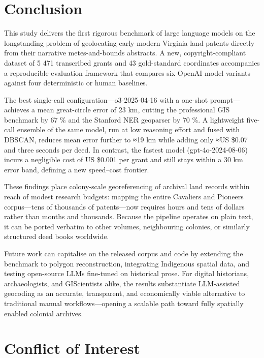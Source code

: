 \section{Conclusion}\label{conclusion}

This study delivers the first rigorous benchmark of large language
models on the longstanding problem of geolocating early-modern Virginia
land patents directly from their narrative metes-and-bounds abstracts. A
new, copyright-compliant dataset of 5 471 transcribed grants and 43
gold-standard coordinates accompanies a reproducible evaluation
framework that compares six OpenAI model variants against four
deterministic or human baselines.

The best single-call configuration---o3-2025-04-16 with a one-shot
prompt---achieves a mean great-circle error of 23 km, cutting the
professional GIS benchmark by 67 \% and the Stanford NER geoparser by 70
\%. A lightweight five-call ensemble of the same model, run at low
reasoning effort and fused with DBSCAN, reduces mean error further to
≈19 km while adding only ≈US \$0.07 and three seconds per deed. In
contrast, the fastest model (gpt-4o-2024-08-06) incurs a negligible cost
of US \$0.001 per grant and still stays within a 30 km error band,
defining a new speed--cost frontier.

These findings place colony-scale georeferencing of archival land
records within reach of modest research budgets: mapping the entire
Cavaliers and Pioneers corpus---tens of thousands of patents---now
requires hours and tens of dollars rather than months and thousands.
Because the pipeline operates on plain text, it can be ported verbatim
to other volumes, neighbouring colonies, or similarly structured deed
books worldwide.

Future work can capitalise on the released corpus and code by extending
the benchmark to polygon reconstruction, integrating Indigenous spatial
data, and testing open-source LLMs fine-tuned on historical prose. For
digital historians, archaeologists, and GIScientists alike, the results
substantiate LLM-assisted geocoding as an accurate, transparent, and
economically viable alternative to traditional manual
workflows---opening a scalable path toward fully spatially enabled
colonial archives.

\section{Conflict of Interest}\label{conflict-of-interest}

